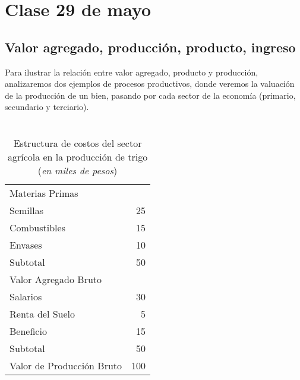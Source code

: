 \section{Clase 29 de mayo}

\subsection{Valor agregado, producción, producto, ingreso}

Para ilustrar la relación entre valor agregado,
producto y producción,
analizaremos dos ejemplos de procesos productivos,
donde veremos la valuación de la producción de un bien,
pasando por cada sector de la economía
(primario, secundario y terciario).

\vspace{.5cm}
\begin{table}[H]
    \centering
    \caption{\\Estructura de costos del sector agrícola en la producción de trigo\\
        (\textit{en miles de pesos})}
    \vspace{.5cm}
    \begin{tabular}{lr}
        \hline
        Materias Primas               &     \\
        \hspace{.3cm} Semillas        & 25  \\
        \hspace{.3cm} Combustibles    & 15  \\
        \hspace{.3cm} Envases         & 10  \\
        Subtotal                      & 50  \\
        \hline
        Valor Agregado Bruto          &     \\
        \hspace{.3cm} Salarios        & 30  \\
        \hspace{.3cm} Renta del Suelo & 5   \\
        \hspace{.3cm} Beneficio       & 15  \\
        Subtotal                      & 50  \\
        \hline
        Valor de Producción Bruto     & 100 \\
    \end{tabular}
\end{table}
\vspace{.5cm}

